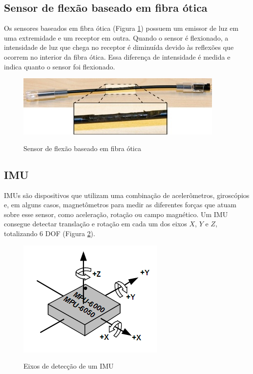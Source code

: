 \subsection{Sensor de flexão baseado em fibra ótica}
\label{subsec:flexotic}
Os sensores baseados em fibra ótica (Figura \ref{fig:flexotico}) possuem um emissor de luz em uma extremidade e um receptor em outra. Quando o sensor é flexionado, a intensidade de luz que chega no receptor é diminuída devido às reflexões que ocorrem no interior da fibra ótica. Essa diferença de intensidade é medida e indica quanto o sensor foi flexionado.

\begin{figure}[H]
  \setlength{\abovecaptionskip}{0pt}
  \setlength{\belowcaptionskip}{0pt}
  \caption[Sensor de flexão baseado em fibra ótica]{Sensor de flexão baseado em fibra ótica}
  \centering
  \includegraphics[width=.5\textwidth]{imagem/twend-optical}
  \captionsetup{justification=centering}
  \label{fig:flexotico}
\end{figure}

\subsection{\acf{IMU}}
\label{subsec:imu}
\ac{IMU}s são dispositivos que utilizam uma combinação de acelerômetros, giroscópios e, em alguns casos, magnetômetros para medir as diferentes forças que atuam sobre esse sensor, como aceleração, rotação ou campo magnético. Um \ac{IMU} consegue detectar translação e rotação em cada um dos eixos $X$, $Y$ e $Z$, totalizando 6 \ac{DOF} (Figura \ref{fig:imu}). 

\begin{figure}[H]
  \setlength{\abovecaptionskip}{0pt}
  \setlength{\belowcaptionskip}{0pt}
  \caption[Eixos de detecção de um \ac{IMU}]{Eixos de detecção de um \ac{IMU}}
  \centering
  \includegraphics[width=.4\textwidth]{imagem/IMU_eixos}
  \captionsetup{justification=centering}
  \label{fig:imu}
\end{figure}

